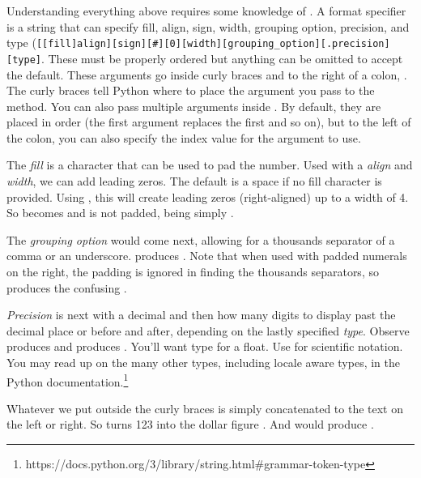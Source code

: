 Understanding everything above requires some knowledge of . A format specifier is a string that can specify fill, align, sign, width, grouping option, precision, and type (\lstinline{[[fill]align][sign][#][0][width][grouping_option][.precision][type]}. These must be properly ordered but anything can be omitted to accept the default. These arguments go inside curly braces and to the right of a colon, \code{\{:\}}. The curly braces tell Python where to place the argument you pass to the  method. You can also pass multiple arguments inside . By default, they are placed in order (the first argument replaces the first \code{\{\}} and so on), but to the left of the colon, you can also specify the index value for the argument to use.

The \emph{fill} is a character that can be used to pad the number. Used with a \emph{align} and \emph{width}, we can add leading zeros. The default is a space if no fill character is provided. Using , this will create leading zeros (right-aligned) up to a width of 4. So  becomes  and  is not padded, being simply . 

The \emph{grouping option} would come next, allowing for a thousands separator of a comma or an underscore.  produces . Note that when used with padded numerals on the right, the padding is ignored in finding the thousands separators, so  produces the confusing .

\emph{Precision} is next with a decimal and then how many digits to display past the decimal place or before and after, depending on the lastly specified \emph{type}. Observe  produces  and  produces . You'll want type  for a float. Use  for scientific notation. You may read up on the many other types, including locale aware types, in the Python documentation.\footnote{https://docs.python.org/3/library/string.html\#grammar-token-type}

Whatever we put outside the curly braces is simply concatenated to the text on the left or right. So  turns 123 into the dollar figure . And  would produce . 

